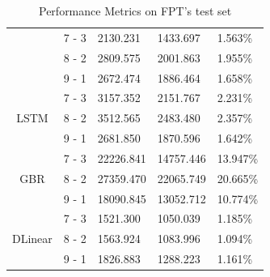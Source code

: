 \documentclass{ieeeojies}
\begin{document}
\begin{table}[H]
\begin{tabular}{|c|c|p{1.2cm}|p{1.2cm}|p{1cm}|}
                       & 7 - 3               & 2130.231      & 1433.697     & 1.563\%       \\
        \cline{2-5}
                       & 8 - 2               & 2809.575      & 2001.863     & 1.955\%       \\
        \cline{2-5}
                       & 9 - 1               & 2672.474      & 1886.464     & 1.658\%       \\
        \hline
        \multirow{3}{*}{LSTM}
                       & 7 - 3               & 3157.352      & 2151.767     & 2.231\%       \\
        \cline{2-5}
                       & 8 - 2               & 3512.565      & 2483.480     & 2.357\%       \\
        \cline{2-5}
                       & 9 - 1               & 2681.850      & 1870.596     & 1.642\%       \\
        \hline
        \multirow{3}{*}{GBR}
                       & 7 - 3               & 22226.841     & 14757.446    & 13.947\%      \\
        \cline{2-5}
                       & 8 - 2               & 27359.470     & 22065.749    & 20.665\%      \\
        \cline{2-5}
                       & 9 - 1               & 18090.845     & 13052.712    & 10.774\%      \\
        \hline
        \multirow{3}{*}{DLinear}
                       & 7 - 3               & 1521.300      & 1050.039     & 1.185\%       \\
        \cline{2-5}
                       & 8 - 2               & 1563.924      & 1083.996     & 1.094\%       \\
        \cline{2-5}
                       & 9 - 1               & 1826.883      & 1288.223     & 1.161\%       \\
        \hline
    \end{tabular}
    \caption{Performance Metrics on FPT's test set}
    \label{tab:performance_metrics_fpt}
\end{table}
\end{document}
